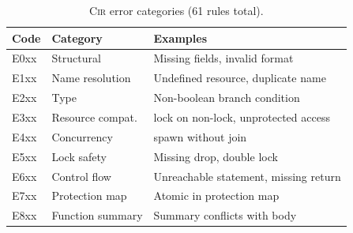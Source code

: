 \documentclass[sigconf]{acmart}
\begin{document}
\begin{table}[h]
\caption{\textsc{Cir} error categories (61 rules total).}
\label{tab:cir-errors}
\centering\footnotesize
\begin{tabular}{@{}llp{4.0cm}@{}}
\toprule
\textbf{Code} & \textbf{Category} & \textbf{Examples} \\
\midrule
E0xx & Structural      & Missing fields, invalid format \\
E1xx & Name resolution & Undefined resource, duplicate name \\
E2xx & Type            & Non-boolean branch condition \\
E3xx & Resource compat.& \textsf{lock} on non-lock, unprotected access \\
E4xx & Concurrency     & \textsf{spawn} without \textsf{join} \\
E5xx & Lock safety     & Missing \textsf{drop}, double lock \\
E6xx & Control flow    & Unreachable statement, missing \textsf{return} \\
E7xx & Protection map  & \textsf{Atomic} in protection map \\
E8xx & Function summary& Summary conflicts with body \\
\bottomrule
\end{tabular}
\end{table}
\end{document}
